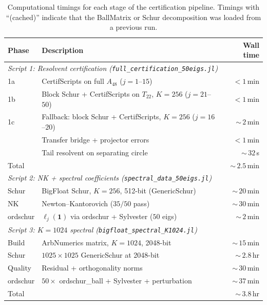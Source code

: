 \documentclass[11pt]{article}
\begin{document}
\begin{table}[ht]
\centering
\caption{Computational timings for each stage of the certification pipeline.
Timings with ``(cached)'' indicate that the BallMatrix or Schur decomposition was loaded from a previous run.}
\label{tab:timings}
\begin{tabular}{lp{7.5cm}r}
\toprule
Phase & Description & Wall time \\
\midrule
\multicolumn{3}{l}{\emph{Script 1: Resolvent certification (\texttt{full\_certification\_50eigs.jl})}} \\
\quad 1a & CertifScripts on full $A_{48}$ ($j = 1$--$15$) & $<\!1$\,min \\
\quad 1b & Block Schur + CertifScripts on $T_{22}$, $K\!=\!256$ ($j = 21$--$50$) & $<\!1$\,min \\
\quad 1c & Fallback: block Schur + CertifScripts, $K\!=\!256$ ($j = 16$--$20$) & ${\sim}\,2$\,min \\
\quad 2 & Transfer bridge + projector errors & $<\!1$\,min \\
\quad 3 & Tail resolvent on separating circle & ${\sim}\,32$\,s \\
\quad Total & & ${\sim}\,2.5$\,min \\
\midrule
\multicolumn{3}{l}{\emph{Script 2: NK + spectral coefficients (\texttt{spectral\_data\_50eigs.jl})}} \\
\quad Schur & BigFloat Schur, $K\!=\!256$, 512-bit (GenericSchur) & ${\sim}\,20$\,min \\
\quad NK & Newton--Kantorovich ($35/50$ pass) & ${\sim}\,30$\,min \\
\quad ordschur & $\ell_j(\mathbf{1})$ via ordschur + Sylvester ($50$ eigs) & ${\sim}\,2$\,min \\
\midrule
\multicolumn{3}{l}{\emph{Script 3: $K\!=\!1024$ spectral (\texttt{bigfloat\_spectral\_K1024.jl})}} \\
\quad Build & ArbNumerics matrix, $K\!=\!1024$, 2048-bit & ${\sim}\,15$\,min \\
\quad Schur & $1025 \times 1025$ GenericSchur at 2048-bit & ${\sim}\,2.8$\,hr \\
\quad Quality & Residual + orthogonality norms & ${\sim}\,30$\,min \\
\quad ordschur & $50 \times$ ordschur\_ball + Sylvester + perturbation & ${\sim}\,37$\,min \\
\quad Total & & ${\sim}\,3.8$\,hr \\
\bottomrule
\end{tabular}
\end{table}
\end{document}
